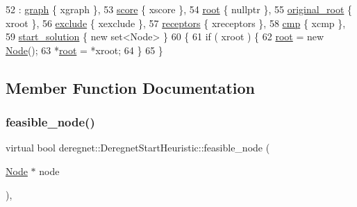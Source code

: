 \begin{DoxyCode}
52  : \hyperlink{classderegnet_1_1DeregnetStartHeuristic_a4da8e53fc7c0fa3dbe0e3ef07296d75e}{graph} \{ xgraph \},
53    \hyperlink{classderegnet_1_1DeregnetStartHeuristic_ae03300e79482975e98f95cba19ad32b0}{score} \{ xscore \},
54    \hyperlink{classderegnet_1_1DeregnetStartHeuristic_a4605d41352e3adf1f9f9f32466a4e61e}{root} \{ \textcolor{keyword}{nullptr} \},
55    \hyperlink{classderegnet_1_1DeregnetStartHeuristic_a22c9ec9b11605201c87dbac622d7618e}{original\_root} \{ xroot \},
56    \hyperlink{classderegnet_1_1DeregnetStartHeuristic_aa22c6581cd404bf7ac325850b28dc951}{exclude} \{ xexclude \},
57    \hyperlink{classderegnet_1_1DeregnetStartHeuristic_ab80c046ff2b7c64086fceb84987b3e50}{receptors} \{ xreceptors \},
58    \hyperlink{classderegnet_1_1DeregnetStartHeuristic_aa5af4d29e3b276c0046c997c16cca3a1}{cmp} \{ xcmp \},
59    \hyperlink{classderegnet_1_1DeregnetStartHeuristic_a7450e11ca0a265b055f95e7832b65e2f}{start\_solution} \{ \textcolor{keyword}{new} set<Node> \}
60 \{
61     \textcolor{keywordflow}{if} ( xroot ) \{
62         \hyperlink{classderegnet_1_1DeregnetStartHeuristic_a4605d41352e3adf1f9f9f32466a4e61e}{root} = \textcolor{keyword}{new} \hyperlink{namespacederegnet_a744bad34f2de9856d36715a445f027f3}{Node}();
63         *\hyperlink{classderegnet_1_1DeregnetStartHeuristic_a4605d41352e3adf1f9f9f32466a4e61e}{root} = *xroot;
64     \}
65 \}
\end{DoxyCode}


\subsection{Member Function Documentation}
\mbox{\label{classderegnet_1_1DeregnetStartHeuristic_ac296c4f122f7d3ad2fcc2cbb0d1b5379}} 
\subsubsection{\texorpdfstring{feasible\+\_\+node()}{feasible\_node()}}
{\footnotesize\ttfamily virtual bool deregnet\+::\+Deregnet\+Start\+Heuristic\+::feasible\+\_\+node (\begin{DoxyParamCaption}\item[{\hyperlink{namespacederegnet_a744bad34f2de9856d36715a445f027f3}{Node} $\ast$}]{node }\end{DoxyParamCaption})\hspace{0.3cm}{\ttfamily [protected]}, {}}



